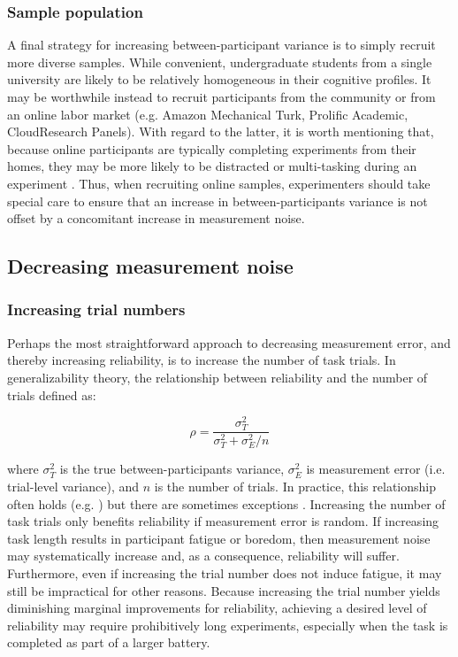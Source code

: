 \documentclass[a4paper,notitlepage,12pt]{article}
\begin{document}
\subsubsection{Sample population}

A final strategy for increasing between-participant variance is to simply recruit more diverse samples. While convenient, undergraduate students from a single university are likely to be relatively homogeneous in their cognitive profiles. It may be worthwhile instead to recruit participants from the community or from an online labor market (e.g. Amazon Mechanical Turk, Prolific Academic, CloudResearch Panels). With regard to the latter, it is worth mentioning that, because online participants are typically completing experiments from their homes, they may be more likely to be distracted or multi-tasking during an experiment \cite{newman2021data}. Thus, when recruiting online samples, experimenters should take special care to ensure that an increase in between-participants variance is not offset by a concomitant increase in measurement noise.

\subsection{Decreasing measurement noise}

\subsubsection{Increasing trial numbers}

Perhaps the most straightforward approach to decreasing measurement error, and thereby increasing reliability, is to increase the number of task trials. In generalizability theory, the relationship between reliability and the number of trials defined as:

\begin{equation}
    \rho = \frac{\sigma^2_T}{\sigma^2_T + \sigma^2_E / n}
\end{equation}

where $\sigma^2_T$ is the true between-participants variance, $\sigma^2_E$ is measurement error (i.e. trial-level variance), and $n$ is the number of trials. In practice, this relationship often holds (e.g. \cite{paap2016role, cooper2017role}) but there are sometimes exceptions \cite{price2015empirical, klingelhoefer2022robust}. Increasing the number of task trials only benefits reliability if measurement error is random. If increasing task length results in participant fatigue or boredom, then measurement noise may systematically increase and, as a consequence, reliability will suffer. Furthermore, even if increasing the trial number does not induce fatigue, it may still be impractical for other reasons. Because increasing the trial number yields diminishing marginal improvements for reliability, achieving a desired level of reliability may require prohibitively long experiments, especially when the task is completed as part of a larger battery.
\end{document}
